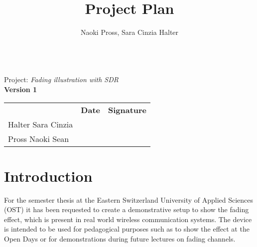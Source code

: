 \documentclass[a4paper, twosided, 11pt]{scrartcl}
\title{Project Plan}
\author{Naoki Pross, Sara Cinzia Halter}
\begin{document}
\begin{titlepage}
	\begin{flushright}
		\vspace{5cm}
		{\Huge \bfseries \thetitle} \\
		\vspace{5mm}
		{\LARGE Project: \textit{Fading illustration with SDR}} \\
		\vspace{5mm}
		{\LARGE \bfseries Version 1}
	\end{flushright}
\end{titlepage}


\vfill
{
	\renewcommand{\arraystretch}{2}
	\begin{tabularx}{\textwidth}{lp{}X}
		                   & \bfseries Date & \bfseries Signature\\
		Halter Sara Cinzia & \hrulefill & \hrulefill \\
		Pross Naoki Sean   & \hrulefill & \hrulefill \\
	\end{tabularx}
}

\clearpage
\tableofcontents
\clearpage

\section{Introduction}

For the semester thesis at the Eastern Switzerland University of Applied Sciences (OST) it has been requested to create a demonstrative setup to show the fading effect, which is present in real world wireless communication systems.
The device is intended to be used for pedagogical purposes such as to show the effect at the Open Days or for demonstrations during future lectures on fading channels.
\end{document}
